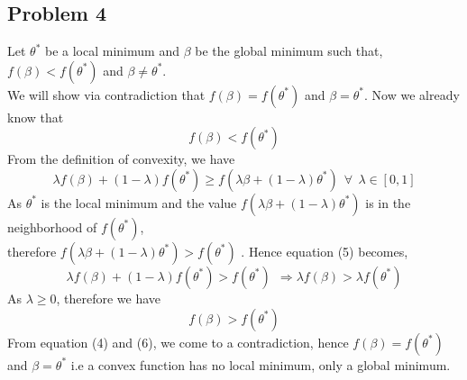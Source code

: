 \documentclass[10pt, a4paper, fleqn]{article}
\begin{document}
\begin{singlespacing}
\section{Problem 4}
Let $\theta^*$ be a local minimum and $\beta$ be the global minimum such that, $f(\beta) < f(\theta^*)$ and $\beta \neq \theta^*$. \\We will show via contradiction that $f(\beta) = f(\theta^*)$ and $\beta = \theta^*$. Now we already know that
\begin{equation}
f(\beta) < f(\theta^*)
\end{equation}
From the definition of convexity, we have 
\begin{equation}
\lambda f(\beta) + (1-\lambda)f(\theta^*) \geq f(\lambda \beta + (1-\lambda)\theta^*) \ \ \forall \ \ \lambda \in [0,1]
\end{equation}
As $\theta^*$ is the local minimum and the value $ f(\lambda \beta + (1-\lambda)\theta^*)$ is in the neighborhood of $f(\theta^*)$, \\therefore $ f(\lambda \beta + (1-\lambda)\theta^*) > f(\theta^*)$ .  Hence equation (5) becomes, 
\begin{equation*}
\lambda f(\beta) + (1-\lambda)f(\theta^*) > f(\theta^*)
\ \ 
\Rightarrow \lambda f(\beta) > \lambda f(\theta^*)
\end{equation*}
As $\lambda \geq 0$, therefore we have
\begin{equation}
f(\beta) > f(\theta^*)
\end{equation}
From equation (4) and (6), we come to a contradiction, hence $f(\beta) = f(\theta^*)$ and $\beta = \theta^*$ i.e a convex function has no local minimum, only a global minimum.
\end{singlespacing}
\end{document}
